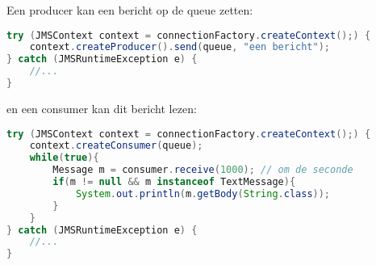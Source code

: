 \documentclass{report}
\begin{document}
Een producer kan een bericht op de queue zetten:
\begin{lstlisting}[language=java]
try (JMSContext context = connectionFactory.createContext();) {
	context.createProducer().send(queue, "een bericht");
} catch (JMSRuntimeException e) {
	//...
}
\end{lstlisting}
en een consumer kan dit bericht lezen:
\begin{lstlisting}[language=java]
try (JMSContext context = connectionFactory.createContext();) {
	context.createConsumer(queue);
	while(true){
		Message m = consumer.receive(1000); // om de seconde
		if(m != null && m instanceof TextMessage){
			System.out.println(m.getBody(String.class));
		}
	}
} catch (JMSRuntimeException e) {
	//...
}
	\end{lstlisting}
\end{document}
